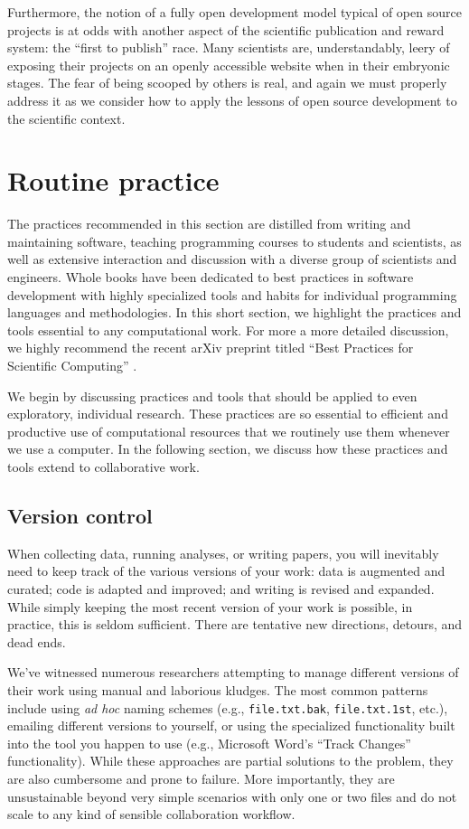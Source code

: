 \documentclass[ChapterTOCs,krantz2]{krantz} %
\begin{document}
Furthermore, the notion of a fully open development model typical of open
source projects is at odds with another aspect of the scientific publication
and reward system: the ``first to publish'' race. Many scientists are,
understandably, leery of exposing their projects on an openly accessible
website when in their embryonic stages. The fear of being scooped by others is
real, and again we must properly address it as we consider how to apply the
lessons of open source development to the scientific context.

\section{\label{sec:practice}Routine practice}

The practices recommended in this section are distilled from 
writing and maintaining software, teaching programming courses to
students and scientists, as well as extensive interaction and discussion with a
diverse group of scientists and engineers.  Whole books have been dedicated to
best practices in software development with highly specialized tools and habits
for individual programming languages and methodologies.  In this short section,
we highlight the practices and tools essential to any computational work. For
more a more detailed discussion, we highly recommend the recent arXiv preprint
titled ``Best Practices for Scientific Computing'' \cite{2012arXiv1210.0530A}.

We begin by discussing practices and tools that should be applied to even
exploratory, individual research.  These practices are so essential to
efficient and productive use of computational resources that we routinely use
them whenever we use a computer. In the following section, we discuss how these
practices and tools extend to collaborative work. 

\subsection{Version control}

When collecting data, running analyses, or writing papers, you will
inevitably need to keep track of the various versions of your work: data is
augmented and curated; code is adapted and improved; and writing is revised and
expanded.  While simply keeping the most recent version of your work is
possible, in practice, this is seldom sufficient.  There are tentative new
directions, detours, and dead ends.

We've witnessed numerous researchers attempting to manage different versions of
their work using manual and laborious kludges. The most common patterns include
using \emph{ad hoc} naming schemes (e.g., \texttt{file.txt.bak},
\texttt{file.txt.1st}, etc.), emailing different versions to yourself, or using
the specialized functionality built into the tool you happen to use (e.g.,
Microsoft Word's ``Track Changes'' functionality).  While these approaches are
partial solutions to the problem, they are also cumbersome and prone to
failure.  More importantly, they are unsustainable beyond very
simple scenarios with only one or two files and do not scale to any kind of
sensible collaboration workflow.
\end{document}
